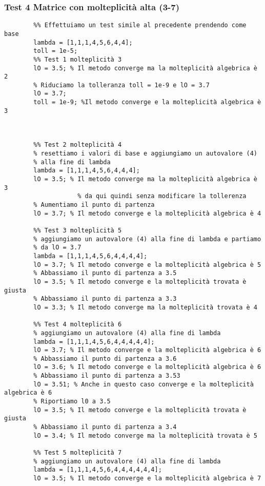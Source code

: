 \documentclass[12pt]{article}
\begin{document}
    \subsubsection{Test 4 Matrice con molteplicità alta (3-7)}
    \begin{verbatim}
        %% Effettuiamo un test simile al precedente prendendo come base
        lambda = [1,1,1,4,5,6,4,4];
        toll = 1e-5;
        %% Test 1 molteplicità 3
        lO = 3.5; % Il metodo converge ma la molteplicità algebrica è 2
        % Riduciamo la tolleranza toll = 1e-9 e lO = 3.7
        lO = 3.7;
        toll = 1e-9; %Il metodo converge e la molteplicità algebrica è 3
        


        %% Test 2 molteplicità 4
        % resettiamo i valori di base e aggiungiamo un autovalore (4)
        % alla fine di lambda
        lambda = [1,1,1,4,5,6,4,4,4];
        lO = 3.5; % Il metodo converge ma la molteplicità algebrica è 3
                    % da qui quindi senza modificare la tollerenza
        % Aumentiamo il punto di partenza
        lO = 3.7; % Il metodo converge e la molteplicità algebrica è 4

        %% Test 3 molteplicità 5
        % aggiungiamo un autovalore (4) alla fine di lambda e partiamo
        % da lO = 3.7
        lambda = [1,1,1,4,5,6,4,4,4,4];
        lO = 3.7; % Il metodo converge e la molteplicità algebrica è 5
        % Abbassiamo il punto di partenza a 3.5
        lO = 3.5; % Il metodo converge e la molteplicità trovata è giusta
        % Abbassiamo il punto di partenza a 3.3
        lO = 3.3; % Il metodo converge ma la molteplicità trovata è 4

        %% Test 4 molteplicità 6
        % aggiungiamo un autovalore (4) alla fine di lambda
        lambda = [1,1,1,4,5,6,4,4,4,4,4];
        lO = 3.7; % Il metodo converge e la molteplicità algebrica è 6
        % Abbassiamo il punto di partenza a 3.6
        lO = 3.6; % Il metodo converge e la molteplicità algebrica è 6
        % Abbassiamo il punto di partenza a 3.53
        lO = 3.51; % Anche in questo caso converge e la molteplicità algebrica è 6
        % Riportiamo l0 a 3.5
        lO = 3.5; % Il metodo converge e la molteplicità trovata è giusta
        % Abbassiamo il punto di partenza a 3.4
        lO = 3.4; % Il metodo converge ma la molteplicità trovata è 5
        
        %% Test 5 molteplicità 7
        % aggiungiamo un autovalore (4) alla fine di lambda
        lambda = [1,1,1,4,5,6,4,4,4,4,4,4];
        lO = 3.5; % Il metodo converge e la molteplicità algebrica è 7
    \end{verbatim}
    \newpage
\end{document}
